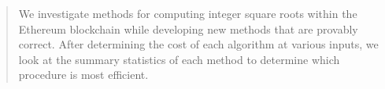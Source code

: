 \begin{abstract}
We investigate methods for computing integer square roots
within the Ethereum blockchain
while developing new methods that are provably correct.
After determining the cost of each algorithm at various inputs,
we look at the summary statistics of each method to determine
which procedure is most efficient.
\end{abstract}
